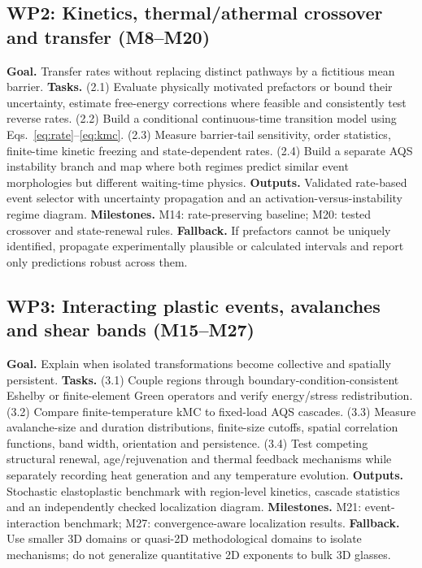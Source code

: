 \documentclass[11pt,a4paper]{article}
\begin{document}
\subsection{WP2: Kinetics, thermal/athermal crossover and transfer (M8--M20)}
\textbf{Goal.} Transfer rates without replacing distinct pathways by a fictitious mean barrier. \textbf{Tasks.} (2.1) Evaluate physically motivated prefactors or bound their uncertainty, estimate free-energy corrections where feasible and consistently test reverse rates. (2.2) Build a conditional continuous-time transition model using Eqs.~\eqref{eq:rate}--\eqref{eq:kmc}. (2.3) Measure barrier-tail sensitivity, order statistics, finite-time kinetic freezing and state-dependent rates. (2.4) Build a separate AQS instability branch and map where both regimes predict similar event morphologies but different waiting-time physics. \textbf{Outputs.} Validated rate-based event selector with uncertainty propagation and an activation-versus-instability regime diagram. \textbf{Milestones.} M14: rate-preserving baseline; M20: tested crossover and state-renewal rules. \textbf{Fallback.} If prefactors cannot be uniquely identified, propagate experimentally plausible or calculated intervals and report only predictions robust across them.

\subsection{WP3: Interacting plastic events, avalanches and shear bands (M15--M27)}
\textbf{Goal.} Explain when isolated transformations become collective and spatially persistent. \textbf{Tasks.} (3.1) Couple regions through boundary-condition-consistent Eshelby or finite-element Green operators and verify energy/stress redistribution. (3.2) Compare finite-temperature kMC to fixed-load AQS cascades. (3.3) Measure avalanche-size and duration distributions, finite-size cutoffs, spatial correlation functions, band width, orientation and persistence. (3.4) Test competing structural renewal, age/rejuvenation and thermal feedback mechanisms while separately recording heat generation and any temperature evolution. \textbf{Outputs.} Stochastic elastoplastic benchmark with region-level kinetics, cascade statistics and an independently checked localization diagram. \textbf{Milestones.} M21: event-interaction benchmark; M27: convergence-aware localization results. \textbf{Fallback.} Use smaller 3D domains or quasi-2D methodological domains to isolate mechanisms; do not generalize quantitative 2D exponents to bulk 3D glasses.
\end{document}
